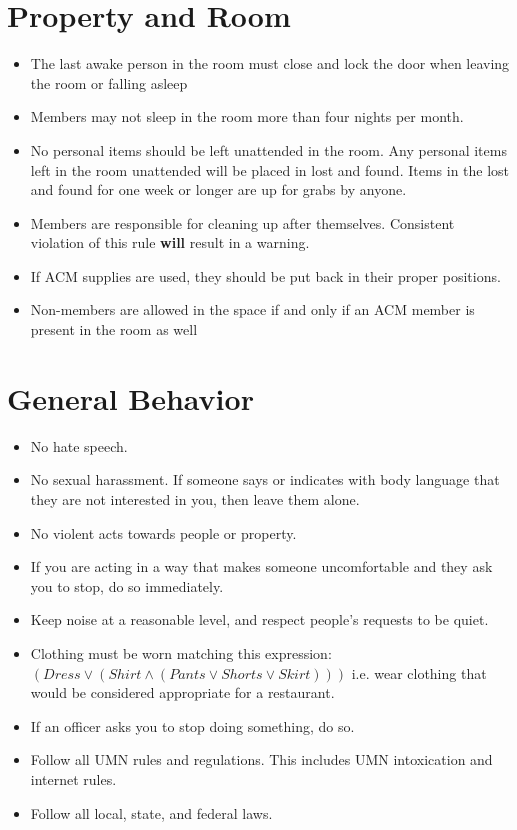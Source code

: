 





\section{Property and Room}
\begin{itemize}
	\item The last awake person in the room must close and lock the door when leaving the room or falling asleep
	\item Members may not sleep in the room more than four nights per month.
	\item No personal items should be left unattended in the room. Any personal items left in the room unattended will be placed in lost and found. Items in the lost and found for one week or longer are up for grabs by anyone.
	\item Members are responsible for cleaning up after themselves. Consistent violation of this rule \textbf{will} result in a warning.
	\item If ACM supplies are used, they should be put back in their proper positions.
	\item Non-members are allowed in the space if and only if an ACM member is present in the room as well
\end{itemize}

\section{General Behavior}
\begin{itemize}
	\item No hate speech.
	\item No sexual harassment. If someone says or indicates with body language that they are not interested in you, then leave them alone.
	\item No violent acts towards people or property.
	\item If you are acting in a way that makes someone uncomfortable and they ask you to stop, do so immediately.
	\item Keep noise at a reasonable level, and respect people’s requests to be quiet.
	\item Clothing must be worn matching this expression: $(Dress \lor (Shirt \land (Pants \lor Shorts \lor Skirt)))$ i.e. wear clothing that would be considered appropriate for a restaurant.
	\item If an officer asks you to stop doing something, do so.
	\item Follow all UMN rules and regulations. This includes UMN intoxication and internet rules.
	\item Follow all local, state, and federal laws.
\end{itemize}


